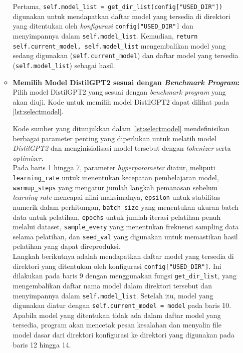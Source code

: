\begin{enumerate}[topsep=0pt]
\begin{itemize}
      Pertama, \texttt{self.model\_list = get\_dir\_list(config["USED\_DIR"])} digunakan untuk mendapatkan daftar model yang tersedia di direktori yang ditentukan oleh \emph{konfigurasi} \texttt{config["USED\_DIR"]} dan menyimpannya dalam \texttt{self.model\_list}. Kemudian, \texttt{return self.current\_model, self.model\_list} mengembalikan model yang sedang digunakan (\texttt{self.current\_model}) dan daftar model yang tersedia (\texttt{self.model\_list}) sebagai hasil.

      \item \textbf{Memilih Model DistilGPT2 sesuai dengan \emph{Benchmark Program}:} Pilih model DistilGPT2 yang sesuai dengan \emph{benchmark program} yang akan diuji.
      Kode untuk memilih model DistilGPT2 dapat dilihat pada \ref{lst:selectmodel}.

      

      Kode sumber yang ditunjukkan dalam \ref{lst:selectmodel} mendefinisikan berbagai parameter penting yang diperlukan untuk melatih model \emph{DistilGPT2} dan menginisialisasi model tersebut dengan \emph{tokenizer} serta \emph{optimizer}. 
      \\

      Pada baris 1 hingga 7, parameter \emph{hyperparameter} diatur, meliputi \texttt{learning\_rate} untuk menentukan kecepatan pembelajaran model, \texttt{warmup\_steps} yang mengatur jumlah langkah pemanasan sebelum \emph{learning rate} mencapai nilai maksimalnya, \texttt{epsilon} untuk stabilitas numerik dalam perhitungan, \texttt{batch\_size} yang menentukan ukuran batch data untuk pelatihan, \texttt{epochs} untuk jumlah iterasi pelatihan penuh melalui dataset, \texttt{sample\_every} yang menentukan frekuensi sampling data selama pelatihan, dan \texttt{seed\_val} yang digunakan untuk memastikan hasil pelatihan yang dapat direproduksi.
      \\

      Langkah berikutnya adalah mendapatkan daftar model yang tersedia di direktori yang ditentukan oleh konfigurasi \texttt{config["USED\_DIR"]}. Ini dilakukan pada baris 9 dengan menggunakan fungsi \texttt{get\_dir\_list}, yang mengembalikan daftar nama model dalam direktori tersebut dan menyimpannya dalam \texttt{self.model\_list}. Setelah itu, model yang digunakan diatur dengan \texttt{self.current\_model = model} pada baris 10. Apabila model yang ditentukan tidak ada dalam daftar model yang tersedia, program akan mencetak pesan kesalahan dan menyalin file model dasar dari direktori konfigurasi ke direktori yang digunakan pada baris 12 hingga 14.
      \\


\end{itemize}
\end{enumerate}
